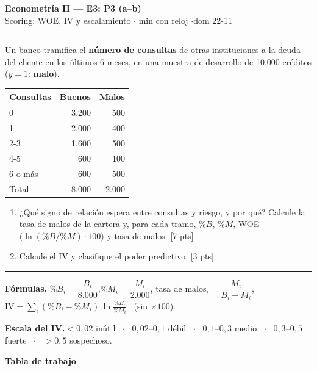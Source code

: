 \documentclass[11pt]{article}
\begin{document}
\begin{center}
{\Large\bfseries Econometría II --- E3: P3 (a--b)}\\[2pt]
Scoring: WOE, IV y escalamiento \quad$\cdot$ min con reloj \quad$\cdot$\quad dom 22-11
\end{center}

\hrule\medskip

Un banco tramifica el \textbf{número de consultas} de otras instituciones a la deuda del cliente en los últimos 6 meses, en una muestra de desarrollo de 10.000 créditos ($y=1$: \textbf{malo}).

\begin{center}
\renewcommand{\arraystretch}{1.15}
\begin{tabular}{lrr}\toprule
Consultas & Buenos & Malos\\\midrule
0 & 3.200 & 500\\
1 & 2.000 & 400\\
2-3 & 1.600 & 500\\
4-5 & 600 & 100\\
6 o más & 600 & 500\\\midrule
Total & 8.000 & 2.000\\\bottomrule
\end{tabular}
\end{center}

\begin{enumerate}[label=\textbf{\alph*)}, leftmargin=*, itemsep=10pt]
\item ¿Qué signo de relación espera entre consultas y riesgo, y por qué? Calcule la tasa de malos de la cartera y, para cada tramo, $\%B$, $\%M$, WOE $\big(\ln(\%B/\%M)\cdot 100\big)$ y tasa de malos. \hfill [7 pts]

\item Calcule el IV y clasifique el poder predictivo. \hfill [3 pts]
\end{enumerate}

\medskip\hrule\medskip

{\small
\textbf{Fórmulas.}\quad
$\%B_i = \dfrac{B_i}{8.000}$,\quad $\%M_i = \dfrac{M_i}{2.000}$,\quad
tasa de malos$_i = \dfrac{M_i}{B_i+M_i}$,\quad
$\text{IV} = \displaystyle\sum_i (\%B_i-\%M_i)\,\ln\!\frac{\%B_i}{\%M_i}$ \ (sin $\times 100$).

\smallskip
\textbf{Escala del IV.}\quad $<0{,}02$ inútil \ $\cdot$ \ $0{,}02$--$0{,}1$ débil \ $\cdot$ \ $0{,}1$--$0{,}3$ medio \ $\cdot$ \ $0{,}3$--$0{,}5$ fuerte \ $\cdot$ \ $>0{,}5$ sospechoso.
}

\bigskip
\textbf{Tabla de trabajo}
\end{document}
